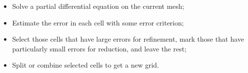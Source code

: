 \documentclass[]{pracamgr}
\begin{document}
        \begin{itemize}
          \item Solve a partial differential equation on the current mesh;
          \item Estimate the error in each cell with some error criterion;
          \item Select those cells that have large errors for refinement, mark those that have particularly small errors for reduction, and leave the rest;
          \item Split or combine selected cells to get a new grid.
        \end{itemize}
\end{document}
